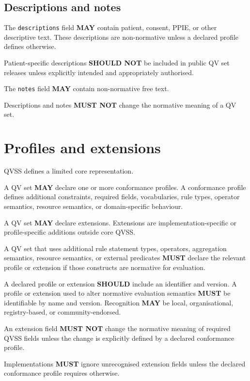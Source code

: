 \documentclass[11pt,a4paper]{article}
\begin{document}
\subsection{Descriptions and notes}

The \texttt{descriptions} field \textbf{MAY} contain patient, consent, PPIE, or other descriptive text. These descriptions are non-normative unless a declared profile defines otherwise.

Patient-specific descriptions \textbf{SHOULD NOT} be included in public QV set releases unless explicitly intended and appropriately authorised.

The \texttt{notes} field \textbf{MAY} contain non-normative free text.

Descriptions and notes \textbf{MUST NOT} change the normative meaning of a QV set.

\section{Profiles and extensions}

QVSS defines a limited core representation.

A QV set \textbf{MAY} declare one or more conformance profiles. A conformance profile defines additional constraints, required fields, vocabularies, rule types, operator semantics, resource semantics, or domain-specific behaviour.

A QV set \textbf{MAY} declare extensions. Extensions are implementation-specific or profile-specific additions outside core QVSS.

A QV set that uses additional rule statement types, operators, aggregation semantics, resource semantics, or external predicates \textbf{MUST} declare the relevant profile or extension if those constructs are normative for evaluation.

A declared profile or extension \textbf{SHOULD} include an identifier and version. A profile or extension used to alter normative evaluation semantics \textbf{MUST} be identifiable by name and version. Recognition \textbf{MAY} be local, organisational, registry-based, or community-endorsed.

An extension field \textbf{MUST NOT} change the normative meaning of required QVSS fields unless the change is explicitly defined by a declared conformance profile.

Implementations \textbf{MUST} ignore unrecognised extension fields unless the declared conformance profile requires otherwise.
\end{document}
